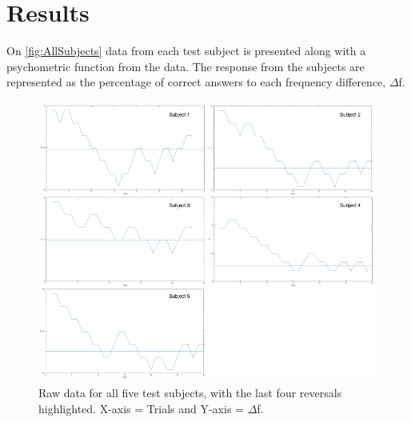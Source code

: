 \section*{Results}
On \autoref{fig:AllSubjects} data from each test subject is presented along with a psychometric function from the data. The response from the subjects are represented as the percentage of correct answers to each frequency difference, $\Delta$f. 
%
\begin{figure}[H]
\centering
\includegraphics[width = \textwidth]{Figure/AllSubjects.png} 
\caption{Raw data for all five test subjects, with the last four reversals highlighted. X-axis = Trials and Y-axis = $\Delta$f.}
\label{fig:AllSubjects}
\end{figure}
\noindent
% 